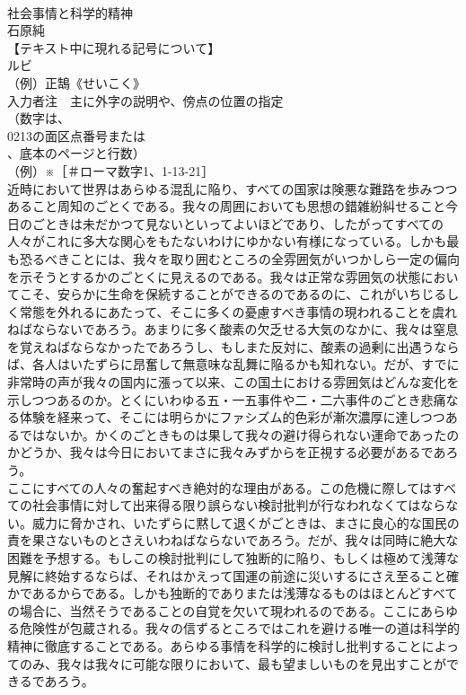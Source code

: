 \documentclass[8pt]{extreport}
\begin{document}
\begin{CJK}{UTF8}{min}
\\	社会事情と科学的精神
\\	石原純
\\	【テキスト中に現れる記号について】
\\	ルビ
\\	（例）正鵠《せいこく》
\\	入力者注　主に外字の説明や、傍点の位置の指定
\\	（数字は、
\\	0213の面区点番号または
\\	、底本のページと行数）
\\	（例）※［＃ローマ数字1、1-13-21］
\\	近時において世界はあらゆる混乱に陥り、すべての国家は険悪な難路を歩みつつあること周知のごとくである。我々の周囲においても思想の錯雑紛糾せること今日のごときは未だかつて見ないといってよいほどであり、したがってすべての人々がこれに多大な関心をもたないわけにゆかない有様になっている。しかも最も恐るべきことには、我々を取り囲むところの全雰囲気がいつかしら一定の偏向を示そうとするかのごとくに見えるのである。我々は正常な雰囲気の状態においてこそ、安らかに生命を保続することができるのであるのに、これがいちじるしく常態を外れるにあたって、そこに多くの憂慮すべき事情の現われることを虞れねばならないであろう。あまりに多く酸素の欠乏せる大気のなかに、我々は窒息を覚えねばならなかったであろうし、もしまた反対に、酸素の過剰に出遇うならば、各人はいたずらに昂奮して無意味な乱舞に陥るかも知れない。だが、すでに非常時の声が我々の国内に漲って以来、この国土における雰囲気はどんな変化を示しつつあるのか。とくにいわゆる五・一五事件や二・二六事件のごとき悲痛なる体験を経来って、そこには明らかにファシズム的色彩が漸次濃厚に達しつつあるではないか。かくのごときものは果して我々の避け得られない運命であったのかどうか、我々は今日においてまさに我々みずからを正視する必要があるであろう。
\\	ここにすべての人々の奮起すべき絶対的な理由がある。この危機に際してはすべての社会事情に対して出来得る限り誤らない検討批判が行なわれなくてはならない。威力に脅かされ、いたずらに黙して退くがごときは、まさに良心的な国民の責を果さないものとさえいわねばならないであろう。だが、我々は同時に絶大な困難を予想する。もしこの検討批判にして独断的に陥り、もしくは極めて浅薄な見解に終始するならば、それはかえって国運の前途に災いするにさえ至ること確かであるからである。しかも独断的でありまたは浅薄なるものはほとんどすべての場合に、当然そうであることの自覚を欠いて現われるのである。ここにあらゆる危険性が包蔵される。我々の信ずるところではこれを避ける唯一の道は科学的精神に徹底することである。あらゆる事情を科学的に検討し批判することによってのみ、我々は我々に可能な限りにおいて、最も望ましいものを見出すことができるであろう。

\end{CJK}
\end{document}
